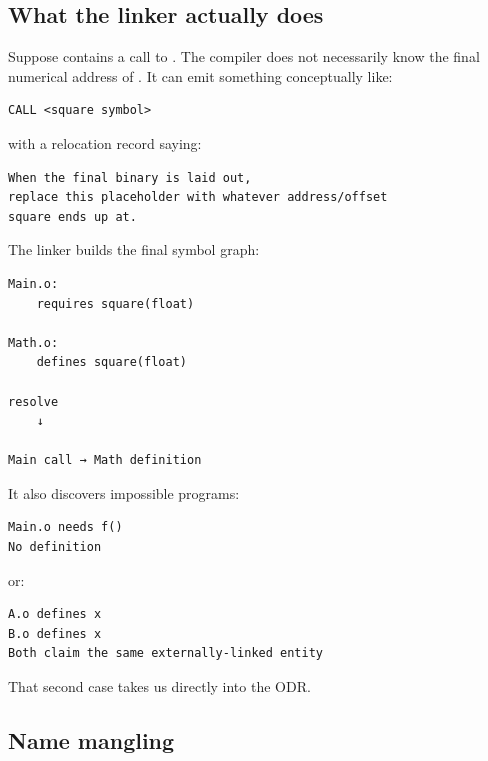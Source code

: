 \subsection{What the linker actually does}\label{05-engine-i-ch002-what-the-linker-actually-does}

\hypertarget{05-engine-i-ch002-what-the-linker-actually-does}{}

Suppose  contains a call to . The compiler does not necessarily know the final numerical address of . It can emit something conceptually like:

\begin{verbatim}
CALL <square symbol>
\end{verbatim}

with a relocation record saying:

\begin{verbatim}
When the final binary is laid out,
replace this placeholder with whatever address/offset
square ends up at.
\end{verbatim}

The linker builds the final symbol graph:

\begin{verbatim}
Main.o:
    requires square(float)

Math.o:
    defines square(float)

resolve
    ↓

Main call → Math definition
\end{verbatim}

It also discovers impossible programs:

\begin{verbatim}
Main.o needs f()
No definition
\end{verbatim}

or:

\begin{verbatim}
A.o defines x
B.o defines x
Both claim the same externally-linked entity
\end{verbatim}

That second case takes us directly into the ODR.

\subsection{Name mangling}\label{05-engine-i-ch002-name-mangling}

\hypertarget{05-engine-i-ch002-name-mangling}{}

